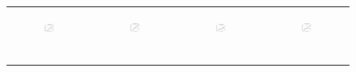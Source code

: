 \begin{figure}[ht]
\begin{tabular}{cccc}
\begin{subfigure}[b]{0.22\textwidth}
	  	\includegraphics[width=110pt]{images/diffFA_CF2G_friendster10M_setcover.pdf}
			\caption{}
			\label{appfig:diffFA_CF2G_friendster10M_setcover}
	  \end{subfigure} &
	  \begin{subfigure}[b]{0.22\textwidth}
	  	\includegraphics[width=110pt]{images/diffFA_CF2G_arabic2005_setcover.pdf}
			\caption{}
			\label{appfig:diffFA_CF2G_arabic2005_setcover}
	  \end{subfigure} &
	  \begin{subfigure}[b]{0.22\textwidth}
	  	\includegraphics[width=110pt]{images/diffFA_CF2G_uk2005_setcover.pdf}
			\caption{}
			\label{appfig:diffFA_CF2G_uk2005_setcover}
	  \end{subfigure} &
	  \begin{subfigure}[b]{0.22\textwidth}
	  	\includegraphics[width=110pt]{images/diffFA_CF2G_it2004_setcover.pdf}
			\caption{}
			\label{appfig:diffFA_CF2G_it2004_setcover}
	  \end{subfigure} \\
	  \begin{subfigure}[b]{0.22\textwidth}

\end{subfigure}
\end{tabular}
\end{figure}
